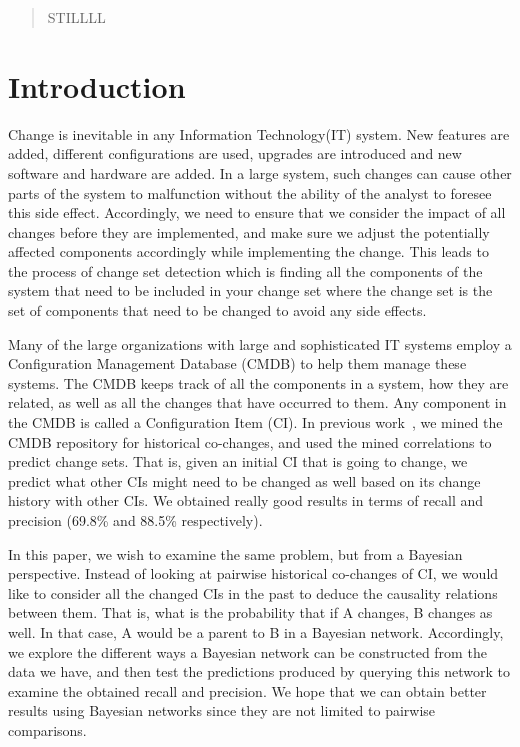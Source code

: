 \documentclass{article}
\begin{document}
 


\begin{abstract} 
STILLLL
\end{abstract} 

\section{Introduction}
\label{intro}

Change is inevitable in any Information Technology(IT) system. New features are added, different configurations are used, upgrades are introduced and new
software and hardware are added. In a large system, such changes can cause other parts of the system to malfunction without the ability of the analyst to
foresee this side effect. Accordingly, we need to ensure that we consider the impact of all changes before they are implemented, and make sure we adjust the
potentially affected components accordingly while implementing the change. This leads to the process of change set detection which is finding all the
components of the system that need to be included in your change set where the change set is the set of components that need to be changed to avoid any side
effects. 

Many of the large organizations with large and sophisticated IT systems employ a Configuration Management Database (CMDB) to help them manage these systems.
The CMDB keeps track of all the components in a system, how they are related, as well as all the changes that have occurred to them. Any component in the CMDB
is called a Configuration Item (CI). In previous work~\cite{nadi2010}, we mined the CMDB repository for historical co-changes, and used the mined correlations
to predict change sets. That is, given an initial CI that is going to change, we predict what other CIs might need to be changed as well based on its change
history with other CIs. We obtained really good results in terms of recall and precision (69.8\% and 88.5\% respectively). 

In this paper, we wish to examine the same problem, but from a Bayesian perspective. Instead of looking at pairwise historical co-changes of CI, we would like
to consider all the changed CIs in the past to deduce the causality relations between them. That is, what is the probability that if A changes, B changes as
well. In that case, A would be a parent to B in a Bayesian network. Accordingly, we explore the different ways a Bayesian network can be constructed from the
data we have, and then test the predictions produced by querying this network to examine the obtained recall and precision. We hope that we can obtain better
results using Bayesian networks since they are not limited to pairwise comparisons. 
\end{document}
